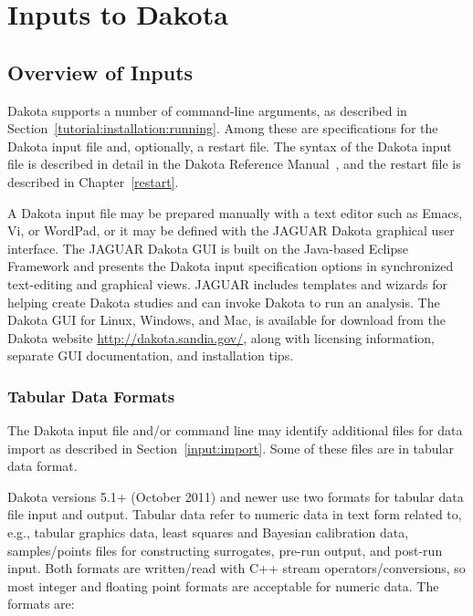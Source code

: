 \chapter{Inputs to Dakota}\label{input}

\section{Overview of Inputs}\label{input:overview}

Dakota supports a number of command-line arguments, as described in
Section~\ref{tutorial:installation:running}.  Among these are
specifications for the Dakota input file and, optionally, a restart
file.  The syntax of the Dakota input file is described in detail in
the Dakota Reference Manual~\cite{RefMan}, and the restart file is
described in Chapter~\ref{restart}.

A Dakota input file may be prepared manually with a text editor such
as Emacs, Vi, or WordPad, or it may be defined with the JAGUAR Dakota
graphical user interface.  The JAGUAR Dakota GUI is built on the
Java-based Eclipse Framework \cite{Eclipse} and presents the Dakota
input specification options in synchronized text-editing and graphical
views.  JAGUAR includes templates and wizards for helping create
Dakota studies and can invoke Dakota to run an analysis.  The Dakota
GUI for Linux, Windows, and Mac, is available for download from the
Dakota website \url{http://dakota.sandia.gov/}, along with licensing
information, separate GUI documentation, and installation tips.

\subsection{Tabular Data Formats}\label{input:tabularformat}

The Dakota input file and/or command line may identify additional
files for data import as described in Section~\ref{input:import}.
Some of these files are in tabular data format.

Dakota versions 5.1+ (October 2011) and newer use two formats for
tabular data file input and output.  Tabular data refer to numeric
data in text form related to, e.g., tabular graphics data, least
squares and Bayesian calibration data, samples/points files for
constructing surrogates, pre-run output, and post-run input.  Both
formats are written/read with C++ stream operators/conversions, so
most integer and floating point formats are acceptable for numeric
data.  The formats are:

